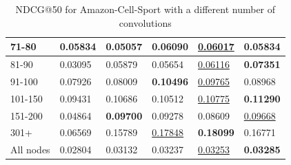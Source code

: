 \begin{table}[]
\begin{tabular}{|l|l|l|l|l|l|}
        71-80     & 0.05834                    & 0.05057                    & \textbf{0.06090}           & \underline{0.06017}        & 0.05834                    \\ \hline
        81-90     & 0.03095                    & 0.05879                    & 0.05654                    & \underline{0.06116}        & \textbf{0.07351}           \\ \hline
        91-100    & 0.07926                    & 0.08009                    & \textbf{0.10496}           & \underline{0.09765}        & 0.08968                    \\ \hline
        101-150   & 0.09431                    & 0.10686                    & 0.10512                    & \underline{0.10775}        & \textbf{0.11290}           \\ \hline
        151-200   & 0.04864                    & \textbf{0.09700}           & 0.09278                    & 0.08609                    & \underline{0.09668}        \\ \hline
        301+      & 0.06569                    & 0.15789                    & \underline{0.17848}        & \textbf{0.18099}           & 0.16771                    \\ \hline
        All nodes & 0.02804                    & 0.03132                    & 0.03237                    & \underline{0.03253}        & \textbf{0.03285}           \\ \hline
    \end{tabular}
    \caption{NDCG@50 for Amazon-Cell-Sport with a different number of convolutions}
    \label{tab:Amazon-cell-sport-con-evaluation}
\end{table}


